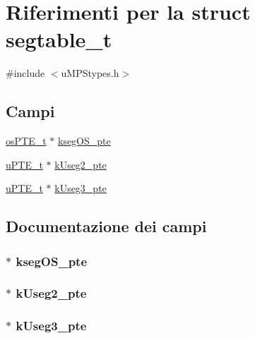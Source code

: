 \hypertarget{structsegtable__t}{\section{Riferimenti per la struct segtable\-\_\-t}
\label{structsegtable__t}
}


{\ttfamily \#include $<$u\-M\-P\-Stypes.\-h$>$}

\subsection*{Campi}
\begin{DoxyCompactItemize}
\item 
\hyperlink{structos_p_t_e__t}{os\-P\-T\-E\-\_\-t} $\ast$ \hyperlink{structsegtable__t_a1ad5abe16dc0227ef51afe8babaa2775}{kseg\-O\-S\-\_\-pte}
\item 
\hyperlink{structu_p_t_e__t}{u\-P\-T\-E\-\_\-t} $\ast$ \hyperlink{structsegtable__t_add1f86d705fdc8ed1dafa2c2b21e30cc}{k\-Useg2\-\_\-pte}
\item 
\hyperlink{structu_p_t_e__t}{u\-P\-T\-E\-\_\-t} $\ast$ \hyperlink{structsegtable__t_a98aea21d8709199bb3dfba4818260493}{k\-Useg3\-\_\-pte}
\end{DoxyCompactItemize}


\subsection{Documentazione dei campi}
\hypertarget{structsegtable__t_a1ad5abe16dc0227ef51afe8babaa2775}{
\subsubsection[{kseg\-O\-S\-\_\-pte}]{ $\ast$ kseg\-O\-S\-\_\-pte}}\label{structsegtable__t_a1ad5abe16dc0227ef51afe8babaa2775}
\hypertarget{structsegtable__t_add1f86d705fdc8ed1dafa2c2b21e30cc}{
\subsubsection[{k\-Useg2\-\_\-pte}]{ $\ast$ k\-Useg2\-\_\-pte}}\label{structsegtable__t_add1f86d705fdc8ed1dafa2c2b21e30cc}
\hypertarget{structsegtable__t_a98aea21d8709199bb3dfba4818260493}{
\subsubsection[{k\-Useg3\-\_\-pte}]{ $\ast$ k\-Useg3\-\_\-pte}}\label{structsegtable__t_a98aea21d8709199bb3dfba4818260493}


